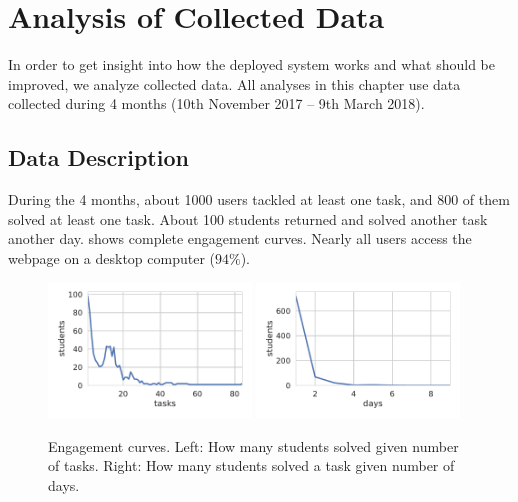 \chapter{Analysis of Collected Data}
\label{chap:analysis}

In order to get insight into how the deployed system works
and what should be improved, we analyze collected data.
All analyses in this chapter use data collected  %
during 4 months (10th November 2017 -- 9th March 2018).


\section{Data Description}

During the 4 months, about 1000 users tackled at least one task,
and 800 of them solved at least one task.
About 100 students returned and solved another task another day.
 shows complete engagement curves.
Nearly all users access the webpage on a desktop computer ($94\%$).

\begin{figure}[htb]
\centering
\includegraphics[width=0.48\textwidth]{img/engagement-tasks}
\includegraphics[width=0.48\textwidth]{img/engagement-days}
\caption{%
  Engagement curves.
  Left: How many students solved given number of tasks.
  Right: How many students solved a task given number of days.}
\label{fig:engagement-curves}
\end{figure}


